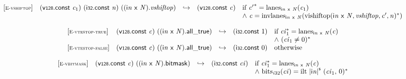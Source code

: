 $$
\begin{array}{@{}l@{}lcl@{}l@{}}
{[\textsc{\scriptsize E{-}vshiftop}]} \quad & (\mathsf{v{\scriptstyle128}}.\mathsf{const}~{\mathit{c}}_{{1}})~(\mathsf{i{\scriptstyle32}}.\mathsf{const}~{\mathit{n}})~(({\mathsf{i}}{{\mathit{n}}}~\mathsf{x}~{\mathit{N}}) . {\mathit{vshiftop}}) &\hookrightarrow& (\mathsf{v{\scriptstyle128}}.\mathsf{const}~{\mathit{c}}) &\quad
  \mbox{if}~{{\mathit{c}'}^\ast} = {{\mathrm{lanes}}}_{{\mathsf{i}}{{\mathit{n}}}~\mathsf{x}~{\mathit{N}}}({\mathit{c}}_{{1}}) \\
 &&&&\quad {\land}~{\mathit{c}} = {{\mathrm{invlanes}}}_{{\mathsf{i}}{{\mathit{n}}}~\mathsf{x}~{\mathit{N}}}({{\mathrm{vishiftop}}({\mathsf{i}}{{\mathit{n}}}~\mathsf{x}~{\mathit{N}}, {\mathit{vshiftop}}, {\mathit{c}'}, {\mathit{n}})^\ast}) \\
\end{array}
$$

\vspace{1ex}

$$
\begin{array}{@{}l@{}lcl@{}l@{}}
{[\textsc{\scriptsize E{-}vtestop{-}true}]} \quad & (\mathsf{v{\scriptstyle128}}.\mathsf{const}~{\mathit{c}})~(({\mathsf{i}}{{\mathit{n}}}~\mathsf{x}~{\mathit{N}}) . \mathsf{all\_true}) &\hookrightarrow& (\mathsf{i{\scriptstyle32}}.\mathsf{const}~1) &\quad
  \mbox{if}~{{\mathit{ci}}_{{1}}^\ast} = {{\mathrm{lanes}}}_{{\mathsf{i}}{{\mathit{n}}}~\mathsf{x}~{\mathit{N}}}({\mathit{c}}) \\
 &&&&\quad {\land}~({\mathit{ci}}_{{1}} \neq 0)^\ast \\
{[\textsc{\scriptsize E{-}vtestop{-}false}]} \quad & (\mathsf{v{\scriptstyle128}}.\mathsf{const}~{\mathit{c}})~(({\mathsf{i}}{{\mathit{n}}}~\mathsf{x}~{\mathit{N}}) . \mathsf{all\_true}) &\hookrightarrow& (\mathsf{i{\scriptstyle32}}.\mathsf{const}~0) &\quad
  \mbox{otherwise} \\
\end{array}
$$

\vspace{1ex}

$$
\begin{array}{@{}l@{}lcl@{}l@{}}
{[\textsc{\scriptsize E{-}vbitmask}]} \quad & (\mathsf{v{\scriptstyle128}}.\mathsf{const}~{\mathit{c}})~(({\mathsf{i}}{{\mathit{n}}}~\mathsf{x}~{\mathit{N}}).\mathsf{bitmask}) &\hookrightarrow& (\mathsf{i{\scriptstyle32}}.\mathsf{const}~{\mathit{ci}}) &\quad
  \mbox{if}~{{\mathit{ci}}_{{1}}^\ast} = {{\mathrm{lanes}}}_{{\mathsf{i}}{{\mathit{n}}}~\mathsf{x}~{\mathit{N}}}({\mathit{c}}) \\
 &&&&\quad {\land}~{{\mathrm{bits}}}_{{{\mathit{i}}}{32}}({\mathit{ci}}) = {{\mathrm{ilt}}~{{|{\mathsf{i}}{{\mathit{n}}}|}^{\mathsf{s}}}~({\mathit{ci}}_{{1}},\, 0)^\ast} \\
\end{array}
$$

